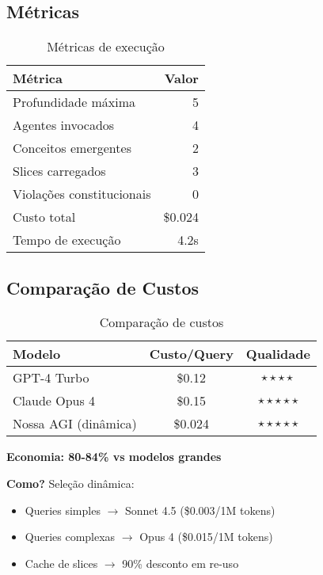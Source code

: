 \documentclass[11pt]{article}
\begin{document}
\subsection{Métricas}

\begin{table}[H]
\centering
\begin{tabular}{@{}lr@{}}
\toprule
\textbf{Métrica} & \textbf{Valor} \\ \midrule
Profundidade máxima & 5 \\
Agentes invocados & 4 \\
Conceitos emergentes & 2 \\
Slices carregados & 3 \\
Violações constitucionais & 0 \\
Custo total & \$0.024 \\
Tempo de execução & 4.2s \\ \bottomrule
\end{tabular}
\caption{Métricas de execução}
\end{table}

\subsection{Comparação de Custos}

\begin{table}[H]
\centering
\begin{tabular}{@{}lcc@{}}
\toprule
\textbf{Modelo} & \textbf{Custo/Query} & \textbf{Qualidade} \\ \midrule
GPT-4 Turbo & \$0.12 & $\star\star\star\star$ \\
Claude Opus 4 & \$0.15 & $\star\star\star\star\star$ \\
Nossa AGI (dinâmica) & \$0.024 & $\star\star\star\star\star$ \\ \bottomrule
\end{tabular}
\caption{Comparação de custos}
\end{table}

\textbf{Economia: 80-84\% vs modelos grandes}

\textbf{Como?} Seleção dinâmica:
\begin{itemize}
    \item Queries simples $\rightarrow$ Sonnet 4.5 (\$0.003/1M tokens)
    \item Queries complexas $\rightarrow$ Opus 4 (\$0.015/1M tokens)
    \item Cache de slices $\rightarrow$ 90\% desconto em re-uso
\end{itemize}
\end{document}
